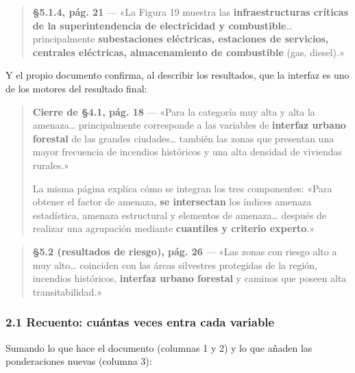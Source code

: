 \documentclass[
  spanish,
  10pt,
]{article}
\begin{document}
\begin{quote}
\textbf{§5.1.4, pág. 21} --- «La Figura 19 muestra las
\textbf{infraestructuras críticas de la superintendencia de electricidad
y combustible}\ldots{} principalmente \textbf{subestaciones eléctricas,
estaciones de servicios, centrales eléctricas, almacenamiento de
combustible} (gas, diesel).»
\end{quote}

Y el propio documento confirma, al describir los resultados, que la
interfaz es uno de los motores del resultado final:

\begin{quote}
\textbf{Cierre de §4.1, pág. 18} --- «Para la categoría muy alta y alta
la amenaza\ldots{} principalmente corresponde a las variables de
\textbf{interfaz urbano forestal} de las grandes ciudades\ldots{}
también las zonas que presentan una mayor frecuencia de incendios
históricos y una alta densidad de viviendas rurales.»

La misma página explica cómo se integran los tres componentes: «Para
obtener el factor de amenaza, \textbf{se intersectan} los índices
amenaza estadística, amenaza estructural y elementos de amenaza\ldots{}
después de realizar una agrupación mediante \textbf{cuantiles y criterio
experto}.»
\end{quote}

\begin{quote}
\textbf{§5.2 (resultados de riesgo), pág. 26} --- «Las zonas con riesgo
alto a muy alto\ldots{} coinciden con las áreas silvestres protegidas de
la región, incendios históricos, \textbf{interfaz urbano forestal} y
caminos que poseen alta transitabilidad.»
\end{quote}

\subsubsection{2.1 Recuento: cuántas veces entra cada
variable}\label{recuento-cuuxe1ntas-veces-entra-cada-variable}

Sumando lo que hace el documento (columnas 1 y 2) y lo que añaden las
ponderaciones nuevas (columna 3):
\end{document}
